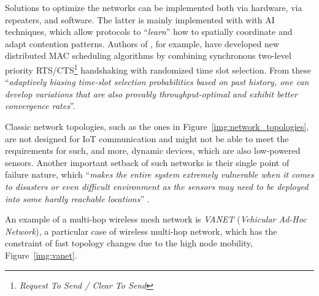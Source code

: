 		Solutions to optimize the networks can be implemented both via hardware, via repeaters, and software.
		The latter is mainly implemented with with AI techniques, which allow protocols to ``\textit{learn}'' how to spatially coordinate and adapt contention patterns.
		Authors of \cite{4068249}, for example, have developed new distributed MAC scheduling algorithms by combining synchronous two-level priority RTS/CTS\footnote{ \textit{Request To Send / Clear To Send}} handshaking with randomized time slot selection.
		From these ``\textit{adaptively biasing time-slot selection probabilities based on past history, one can develop variations that are also provably throughput-optimal and exhibit better convergence rates}''.
		
		Classic network topologies, such as the ones in Figure~\ref{img:network_topologies}, are not designed for IoT communication and might not be able to meet the requirements for such, and more, dynamic devices, which are also low-powered sensors.
		Another important setback of such networks is their single point of failure nature, which ``\textit{makes the entire system extremely vulnerable when it comes to disasters or even difficult environment as the sensors may need to be deployed into some hardly reachable locations}'' \cite{7968828}.
		
		An example of a multi-hop wireless mesh network is \textit{VANET} (\textit{Vehicular Ad-Hoc Network}), a particular case of wireless multi-hop network, which has the constraint of fast topology changes due to the high node mobility, Figure~\ref{img:vanet}.
		

